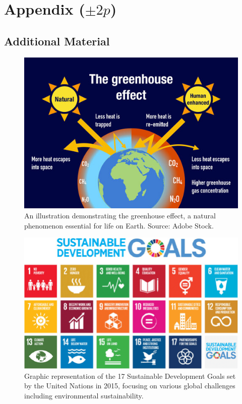 \documentclass[conference,compsoc]{IEEEtran}
\begin{document}
\cleardoublepage
\section*{Appendix ($\pm 2p$)}
\subsection*{Additional Material}
\begin{figure}[H]
	\centering
	\includegraphics[width=\linewidth]{images/fig1.jpg}
	\caption{An illustration demonstrating the greenhouse effect, a natural phenomenon essential for life on Earth. Source: Adobe Stock.}
	\label{fig:Greenhouse Effect Illustration}
\end{figure}

\begin{figure}[H]
	\centering
	\includegraphics[width=\linewidth]{images/fig2.png}
	\caption{Graphic representation of the 17 Sustainable Development Goals set by the United Nations in 2015, focusing on various global challenges including environmental sustainability.}
	\label{fig:Sustainable Development Goals (SDG)}
\end{figure}
\end{document}

